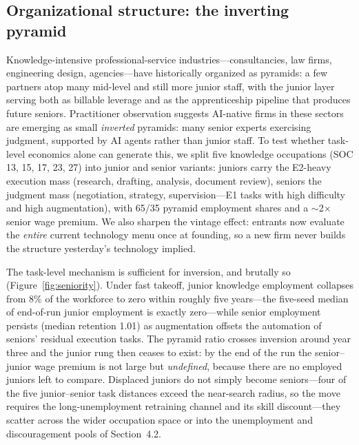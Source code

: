 \documentclass[11pt,a4paper]{article}
\begin{document}
\subsection{Organizational structure: the inverting pyramid}
\label{sec:pyramid}

Knowledge-intensive professional-service industries---consultancies, law firms,
engineering design, agencies---have historically organized as pyramids: a few partners
atop many mid-level and still more junior staff, with the junior layer serving both as
billable leverage and as the apprenticeship pipeline that produces future seniors.
Practitioner observation suggests AI-native firms in these sectors are emerging as
small \emph{inverted} pyramids: many senior experts exercising judgment, supported by
AI agents rather than junior staff. To test whether task-level economics alone can
generate this, we split five knowledge occupations (SOC 13, 15, 17, 23, 27) into
junior and senior variants: juniors carry the E2-heavy execution mass (research,
drafting, analysis, document review), seniors the judgment mass (negotiation,
strategy, supervision---E1 tasks with high difficulty and high augmentation), with
65/35 pyramid employment shares and a $\sim$2$\times$ senior wage premium. We also
sharpen the vintage effect: entrants now evaluate the \emph{entire} current technology
menu once at founding, so a new firm never builds the structure yesterday's technology
implied.

The task-level mechanism is sufficient for inversion, and brutally so
(Figure~\ref{fig:seniority}). Under fast takeoff, junior knowledge employment collapses
from 8\% of the workforce to zero within roughly five years---the five-seed median of
end-of-run junior employment is exactly zero---while senior employment persists
(median retention 1.01) as augmentation offsets the automation of seniors' residual
execution tasks. The pyramid ratio crosses inversion around year three and the junior
rung then ceases to exist: by the end of the run the senior--junior wage premium is not
large but \emph{undefined}, because there are no employed juniors left to compare.
Displaced juniors do not simply become seniors---four of the five junior--senior task
distances exceed the near-search radius, so the move requires the long-unemployment
retraining channel and its skill discount---they scatter across the wider occupation
space or into the unemployment and discouragement pools of Section~4.2.
\end{document}
